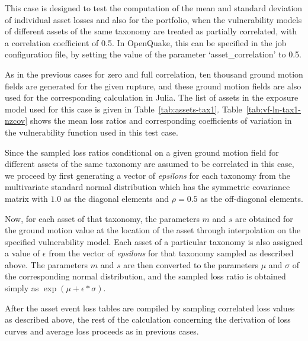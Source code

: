 This case is designed to test the computation of the mean and standard deviation of individual asset losses and also for the portfolio, when the vulnerability models of different assets of the same taxonomy are treated as partially correlated, with a correlation coefficient of 0.5. In OpenQuake, this can be specified in the job configuration file, by setting the value of the parameter `asset\_correlation' to 0.5.

As in the previous cases for zero and full correlation, ten thousand ground motion fields are generated for the given rupture, and these ground motion fields are also used for the corresponding calculation in Julia. The list of assets in the exposure model used for this case is given in Table~\ref{tab:assets-tax1}. Table~\ref{tab:vf-ln-tax1-nzcov} shows the mean loss ratios and corresponding coefficients of variation in the vulnerability function used in this test case.

Since the sampled loss ratios conditional on a given ground motion field for different assets of the same taxonomy are assumed to be  correlated in this case, we proceed by first generating a vector of \emph{epsilons} for each taxonomy from the multivariate standard normal distribution which has the symmetric covariance matrix with $1.0$ as the diagonal elements and $\rho = 0.5$ as the off-diagonal elements.

Now, for each asset of that taxonomy, the parameters $m$ and $s$ are obtained for the ground motion value at the location of the asset through interpolation on the specified vulnerability model. Each asset of a particular taxonomy is also assigned a value of $\epsilon$ from the vector of \emph{epsilons} for that taxonomy sampled as described above. The parameters $m$ and $s$ are then converted to the parameters $\mu$ and $\sigma$ of the corresponding normal distribution, and the sampled loss ratio is obtained simply as $\exp (\mu + \epsilon * \sigma)$.

After the asset event loss tables are compiled by sampling correlated loss values as described above, the rest of the calculation concerning the derivation of loss curves and average loss proceeds as in previous cases.